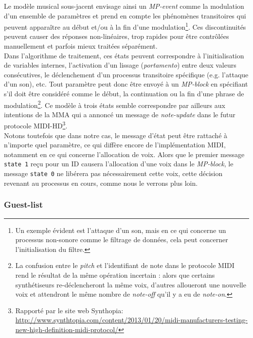 \noindent Le modèle musical sous-jacent envisage ainsi un \textit{MP-event} comme la modulation d'un ensemble de paramètres et prend en compte les phénomènes transitoires qui peuvent apparaître au début et/ou à la fin d'une modulation\footnote{ Un exemple évident est l'attaque d'un son, mais en ce qui concerne un processus non-sonore comme le filtrage de données, cela peut concerner l'initialisation du filtre.}. Ces discontinuités peuvent causer des réponses non-linéaires, trop rapides pour être contrôlées manuellement et parfois mieux traitées séparément.\\
\indent Dans l'algorithme de traitement, ces états peuvent correspondre à l'initialisation de variables internes, l'activation d'un lissage (\textit{portamento}) entre deux valeurs consécutives, le déclenchement d'un processus transitoire spécifique (e.g. l'attaque d'un son), etc. Tout paramètre peut donc être envoyé à un \textit{MP-block} en spécifiant s'il doit être considéré comme le début, la continuation ou la fin d'une phrase de modulation\footnote{ La confusion entre le \textit{pitch} et l'identifiant de note dans le protocole \gls{MIDI} rend le résultat de la même opération incertain : alors que certains synthétiseurs re-déclencheront la même voix, d'autres alloueront une nouvelle voix et attendront le même nombre de \textit{note-off} qu'il y a eu de \textit{note-on}.}. Ce modèle à trois états semble correspondre par ailleurs aux intentions de la \gls{MMA} qui a annoncé un message de \textit{note-update} dans le futur protocole MIDI-HD\footnote{Rapporté par le site web Synthopia: \url{http://www.synthtopia.com/content/2013/01/20/midi-manufacturers-testing-new-high-definition-midi-protocol/}}.\\
\indent Notons toutefois que dans notre cas, le message d'état peut être rattaché à n'importe quel paramètre, ce qui diffère encore de l'implémentation \gls{MIDI}, notamment en ce qui concerne l'allocation de voix. Alors que le premier message \verb|state 1| reçu pour un ID causera l'allocation d'une voix dans le \textit{MP-block}, le message \verb|state 0| ne libérera pas nécessairement cette voix, cette décision revenant au processus en cours, comme nous le verrons plus loin.

\subsubsection{Guest-list}

